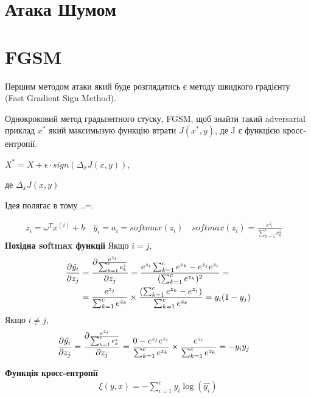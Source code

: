 \documentclass[a4paper,14pt]{extreport}
\newcommand{\tran}{^{T}}
\newcommand{\ith}{^{(i)}}
\begin{document}
	\section{Атака Шумом}
	
	\section{FGSM} 
	Першим методом атаки який буде розглядатись є методу швидкого градієнту (Fast Gradient Sign Method).
	
	Однокроковий метод градыэнтного стуску, FGSM, щоб знайти такий adversarial приклад $x^{*}$ який максимызую функцію втрати $J(x^{*}, y)$, де J є функцією кросс-ентропії.
	
	$ X^{*} = X + \epsilon \cdot sign(\Delta_x J(x, y))$, 
	
	де $\Delta_x J(x, y)$
	
	
	Ідея полягає в тому ..=.
	
	\begin{align*}
		z_i = \omega\tran x\ith + b \quad
		\hat{y}_i = a_i = softmax(z_i) \quad
		softmax(z_i) = \frac{e^{z_i}}{\sum_{k=1}^{c} e_k^z} \quad
	\end{align*}
	\textbf{Похідна softmax функції} \newline
	Якщо $i = j$,
	\begin{align*}
	    \pdv{\hat{y_i}}{z_j} 
	    &=
	    \pdv{\frac{e^{z_i}}{\sum_{k=1}^{c} e_k^z}}{z_j} 
	    =
	    \frac{e^{z_i} \sum_{k=1}^{c} e^{z_k} - e^{z_j} e^{z_i}}{(\sum_{k=1}^{c}  e^{z_k})^2} 
	    = \\& =
	    \frac{e^{z_j}}{\sum_{k=1}^{c}  e^{z_k}} \times \frac{(\sum_{k=1}^{c} e^{z_k} - e^{z_j})}{\sum_{k=1}^{c}  e^{z_k}} 
	    = 
	    y_i(1-y_j)
	\end{align*}
	Якщо $i \neq j$,
	\begin{align*}
		\pdv{\hat{y_i}}{z_j}
		&=
		\pdv{\frac{e^{z_i}}{\sum_{k=1}^{c} e_k^z}}{z_j} 
		=
		\frac{0 - e^{z_j} e^{z_i}}{\sum_{k=1}^{c}  e^{z_k}} \times \frac{e^{z_i}}{\sum_{k=1}^{c} e^{z_k}} 
		= 
		-y_i y_j 
	\end{align*}
	
	\textbf{Функція кросс-ентропії}
	\begin{align*}
		\xi(y, x) = - \sum_{i=1}^{c} y_i  \log (\hat{y_i})
	\end{align*}
	
\end{document}
